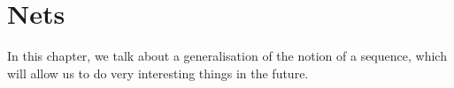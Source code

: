 \chapter{Nets}

In this chapter, we talk about a generalisation of the notion of a sequence, which will allow us to do very interesting things in the future.


